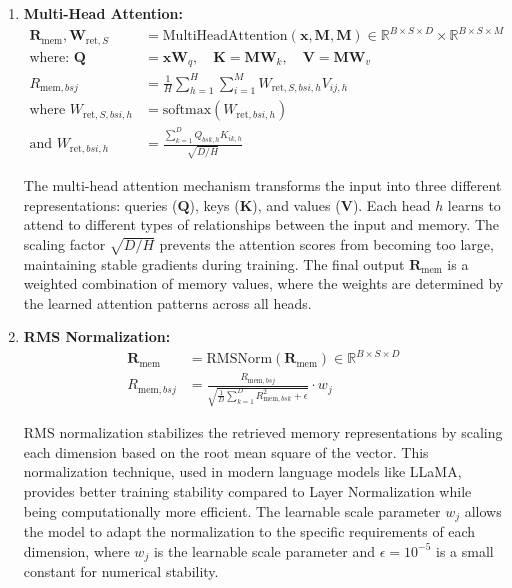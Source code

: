 \documentclass{article}
\begin{document}
\begin{enumerate}
\item \textbf{Multi-Head Attention:}
\begin{align}
\mathbf{R}_{\text{mem}}, \mathbf{W}_{\text{ret},S} &= \text{MultiHeadAttention}(\mathbf{x}, \mathbf{M}, \mathbf{M}) \in \mathbb{R}^{B \times S \times D} \times \mathbb{R}^{B \times S \times M} \\
\text{where: } \mathbf{Q} &= \mathbf{x} \mathbf{W}_q, \quad \mathbf{K} = \mathbf{M} \mathbf{W}_k, \quad \mathbf{V} = \mathbf{M} \mathbf{W}_v \\
R_{\text{mem},bsj} &= \frac{1}{H}\sum_{h=1}^{H} \sum_{i=1}^{M} W_{\text{ret},S,bsi,h} V_{ij,h} \\
\text{where } W_{\text{ret},S,bsi,h} &= \text{softmax}(W_{\text{ret},bsi,h}) \\
\text{and } W_{\text{ret},bsi,h} &= \frac{\sum_{k=1}^{D} Q_{bsk,h} K_{ik,h}}{\sqrt{D/H}}
\end{align}

The multi-head attention mechanism transforms the input into three different representations: queries ($\mathbf{Q}$), keys ($\mathbf{K}$), and values ($\mathbf{V}$). Each head $h$ learns to attend to different types of relationships between the input and memory. The scaling factor $\sqrt{D/H}$ prevents the attention scores from becoming too large, maintaining stable gradients during training. The final output $\mathbf{R}_{\text{mem}}$ is a weighted combination of memory values, where the weights are determined by the learned attention patterns across all heads.

\item \textbf{RMS Normalization:}
\begin{align}
\mathbf{R}_{\text{mem}} &= \text{RMSNorm}(\mathbf{R}_{\text{mem}}) \in \mathbb{R}^{B \times S \times D} \\
R_{\text{mem},bsj} &= \frac{R_{\text{mem},bsj}}{\sqrt{\frac{1}{D}\sum_{k=1}^{D} R_{\text{mem},bsk}^2 + \epsilon}} \cdot w_j
\end{align}

RMS normalization stabilizes the retrieved memory representations by scaling each dimension based on the root mean square of the vector. This normalization technique, used in modern language models like LLaMA, provides better training stability compared to Layer Normalization while being computationally more efficient. The learnable scale parameter $w_j$ allows the model to adapt the normalization to the specific requirements of each dimension, where $w_j$ is the learnable scale parameter and $\epsilon = 10^{-5}$ is a small constant for numerical stability.


\end{enumerate}
\end{document}
